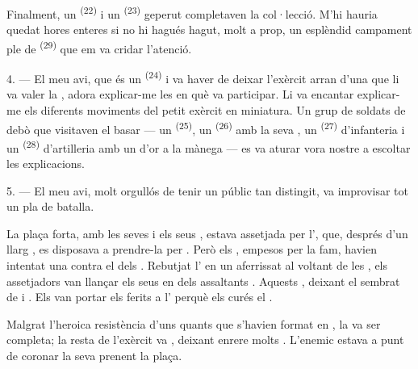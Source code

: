 Finalment, un  \textsuperscript{(22)} i un 
\textsuperscript{(23)} geperut completaven la col·lecció. M'hi hauria quedat hores
enteres si no hi hagués hagut, molt a prop, un esplèndid campament ple de
 \textsuperscript{(29)} que em va cridar l'atenció.

\VUsaut{4.0mm}
\VUsaut{2.8mm}

4. --- El meu avi, que és un  \textsuperscript{(24)} i va
haver de deixar l'exèrcit arran d'una  que li va valer la
, adora explicar-me les  en què va
participar. Li va encantar explicar-me els diferents moviments del petit exèrcit
en miniatura. Un grup de soldats de debò que visitaven el basar --- un
 \textsuperscript{(25)}, un 
\textsuperscript{(26)} amb la seva , un 
\textsuperscript{(27)} d'infanteria i un  \textsuperscript{(28)}
d'artilleria amb un  d'or a la mànega --- es va aturar vora nostre a
escoltar les explicacions.

5. --- El meu avi, molt orgullós de tenir un públic tan distingit, va improvisar
tot un pla de batalla.

La plaça forta, amb les seves  i els seus ,
estava assetjada per l', que, després d'un llarg
, es disposava a prendre-la per . Però els
, empesos per la fam, havien intentat una 
contra el  dels . Rebutjat l'
en un aferrissat  al voltant de les , els
assetjadors  van llançar els seus  en
 dels assaltants . Aquests , deixant el  sembrat de  i
. Els  van portar els ferits a l' perquè els curés el .

Malgrat l'heroica resistència d'uns quants  que s'havien format
en , la  va ser completa; la resta de l'exèrcit va
, deixant enrere molts . L'enemic estava a punt de
coronar la seva  prenent la plaça.

